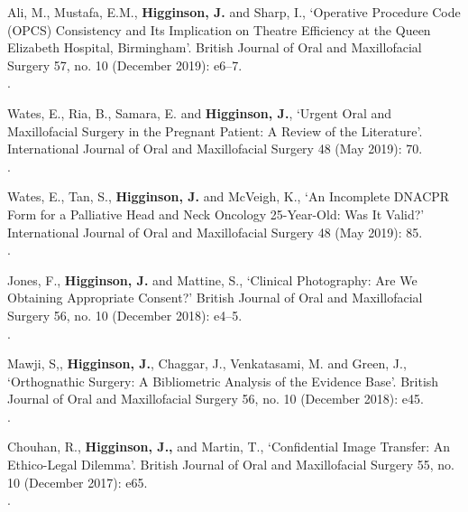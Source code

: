\vspace{0.1cm}

 Ali, M., Mustafa, E.M., \textbf{Higginson, J.} and Sharp, I., `Operative Procedure Code (OPCS) Consistency and Its Implication on Theatre Efficiency at the Queen Elizabeth Hospital, Birmingham’. British Journal of Oral and Maxillofacial Surgery 57, no. 10 (December 2019): e6–7. 
\\.

\vspace{0.1cm}

 Wates, E., Ria, B., Samara, E. and \textbf{Higginson, J.}, `Urgent Oral and Maxillofacial Surgery in the Pregnant Patient: A Review of the Literature’. International Journal of Oral and Maxillofacial Surgery 48 (May 2019): 70. 
\\.

\vspace{0.1cm}

 Wates, E., Tan, S., \textbf{Higginson, J.} and McVeigh, K., `An Incomplete DNACPR Form for a Palliative Head and Neck Oncology 25-Year-Old: Was It Valid?’ International Journal of Oral and Maxillofacial Surgery 48 (May 2019): 85. 
\\.

\vspace{0.1cm}

 Jones, F., \textbf{Higginson, J.} and Mattine, S., `Clinical Photography: Are We Obtaining Appropriate Consent?’ British Journal of Oral and Maxillofacial Surgery 56, no. 10 (December 2018): e4–5. 
\\.

\vspace{0.1cm}

 Mawji, S,, \textbf{Higginson, J.}, Chaggar, J.,  Venkatasami, M. and Green, J., `Orthognathic Surgery: A Bibliometric Analysis of the Evidence Base’. British Journal of Oral and Maxillofacial Surgery 56, no. 10 (December 2018): e45. 
\\.

\vspace{0.1cm}

 Chouhan, R., \textbf{Higginson, J.,} and Martin, T., `Confidential Image Transfer: An Ethico-Legal Dilemma’. British Journal of Oral and Maxillofacial Surgery 55, no. 10 (December 2017): e65.
\\.

